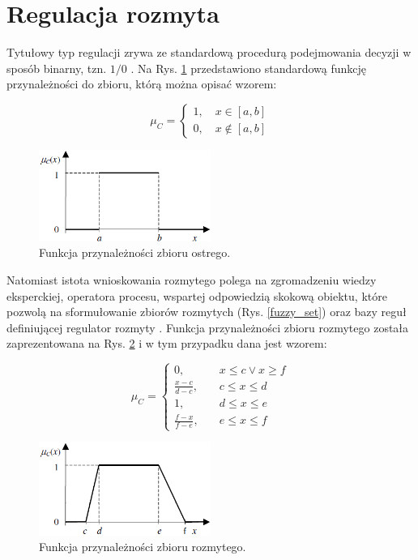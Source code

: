 \section{Regulacja rozmyta}
Tytułowy typ regulacji zrywa ze standardową procedurą podejmowania decyzji w sposób binarny, tzn. $1 / 0$ \cite{40}. Na Rys. \ref{crisp} przedstawiono standardową funkcję przynależności do zbioru, którą można opisać wzorem:

\begin{equation}
\mu_C = \begin{cases}
1, \quad x \in [a, b] \\
0, \quad x \notin [a, b]
\end{cases}
\end{equation}

\begin{figure}[h!]
\centering
\includegraphics[width=0.5\textwidth]{pictures/crisp}
\caption{Funkcja przynależności zbioru ostrego.}
\label{crisp}
\end{figure}

Natomiast istota wnioskowania rozmytego polega na zgromadzeniu wiedzy eksperckiej, operatora procesu, wspartej odpowiedzią skokową obiektu, które pozwolą na sformułowanie zbiorów rozmytych (Rys. \ref{fuzzy_set}) oraz bazy reguł definiującej regulator rozmyty \cite{160, 170}. Funkcja przynależności zbioru rozmytego została zaprezentowana na Rys. \ref{fuzzy} i w tym przypadku dana jest wzorem:

\begin{equation}
\mu_C = \begin{cases}
0,& \quad x \leq c \vee x \geq f \\
\frac{x-c}{d-c},& \quad c \leq x \leq d \\ 
1,& \quad d \leq x \leq e \\
\frac{f-x}{f-e},& \quad e \leq x \leq f
\end{cases}
\end{equation}

\begin{figure}[h!]
\centering
\includegraphics[width=0.5\textwidth]{pictures/fuzzy}
\caption{Funkcja przynależności zbioru rozmytego.}
\label{fuzzy}
\end{figure}

